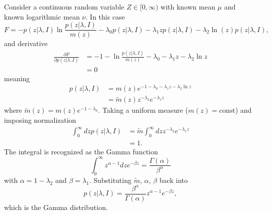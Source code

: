 \begin{example}
	Consider a continuous random variable $Z \in [0,\infty)$ with known mean $\mu$ and known logarithmic mean $\nu$. In this case
	\begin{equation}
		F = - p(z|\lambda,I) \ln \frac{p(z|\lambda,I)}{m(z)} - \lambda_0 p(z|\lambda,I) - \lambda_1 z p(z|\lambda,I) - \lambda_2 \ln(z) p(z|\lambda,I),
	\end{equation}
	and derivative
	\begin{equation}
		\begin{split}
			\frac{\partial F}{\partial p(z|\lambda,I)} &= -1 - \ln\frac{p(z|\lambda,I)}{m(z)} - \lambda_0 - \lambda_1 z - \lambda_2 \ln z\\
			& = 0
		\end{split}
	\end{equation}
	meaning
	\begin{equation}
		\begin{split}
			p(z|\lambda,I)&= m(z) e^{-1-\lambda_0 - \lambda_1 z - \lambda_2 \ln z}\\
			& = \tilde{m}(z)  z^{-\lambda_2} e^{-\lambda_1 z}
		\end{split}
		\label{eq:gam1}
	\end{equation}
	where $\tilde{m}(z) = m(z) e^{-1-\lambda_0}$. Taking a uniform measure ($m(z) = \text{const}$) and imposing normalization
	\begin{equation}
		\begin{split}
			\int_0^\infty dz p(z|\lambda,I) &= \tilde{m} \int_0^\infty dz z^{-\lambda_2} e^{-\lambda_1 z}\\
			& = 1.
		\end{split}
	\end{equation}
	The integral is recognized as the Gamma function
	\begin{equation}
		\int_0^\infty z^{\alpha-1} dz e^{-\beta z} = \frac{\Gamma(\alpha)}{\beta^\alpha}
	\end{equation}
	with $\alpha = 1 - \lambda_2$ and $\beta = \lambda_1$. Substituting $\tilde{m}$, $\alpha$, $\beta$ back into 
	\begin{equation}
		p(z|\lambda,I) = \frac{\beta^\alpha}{\Gamma(\alpha)} z^{\alpha-1} e^{-\beta z},
	\end{equation}
	which is the Gamma distribution.
\end{example}

